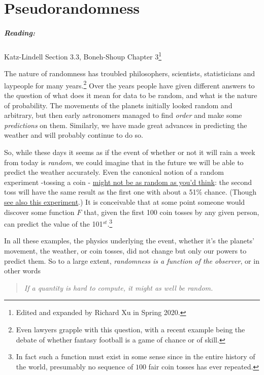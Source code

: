 \chapter{Pseudorandomness}\label{3-Pseudorandomness}

\paragraph{Reading:} Katz-Lindell Section 3.3, Boneh-Shoup Chapter
3\footnote{Edited and expanded by Richard Xu in Spring 2020.}

The nature of randomness has troubled philosophers, scientists,
statisticians and laypeople for many years.\footnote{Even lawyers
  grapple with this question, with a recent example being the debate of
  whether fantasy football is a game of chance or of skill.} Over the
years people have given different answers to the question of what does
it mean for data to be random, and what is the nature of probability.
The movements of the planets initially looked random and arbitrary, but
then early astronomers managed to find \emph{order} and make some
\emph{predictions} on them. Similarly, we have made great advances in
predicting the weather and will probably continue to do so.

So, while these days it seems as if the event of whether or not it will
rain a week from today is \emph{random}, we could imagine that in the
future we will be able to predict the weather accurately. Even the
canonical notion of a random experiment -tossing a coin -
\href{http://statweb.stanford.edu/~susan/papers/headswithJ.pdf}{might
not be as random as you'd think}: the second toss will have the same
result as the first one with about a 51\% chance. (Though
\href{https://www.stat.berkeley.edu/~aldous/Real-World/coin_tosses.html}{see
also this experiment}.) It is conceivable that at some point someone
would discover some function \(F\) that, given the first 100 coin tosses
by any given person, can predict the value of the
101\(^{st}\).\footnote{In fact such a function must exist in some sense
  since in the entire history of the world, presumably no sequence of
  \(100\) fair coin tosses has ever repeated.}

In all these examples, the physics underlying the event, whether it's
the planets' movement, the weather, or coin tosses, did not change but
only our powers to predict them. So to a large extent, \emph{randomness
is a function of the observer}, or in other words

\begin{quote}
\emph{If a quantity is hard to compute, it might as well be random.}
\end{quote}

